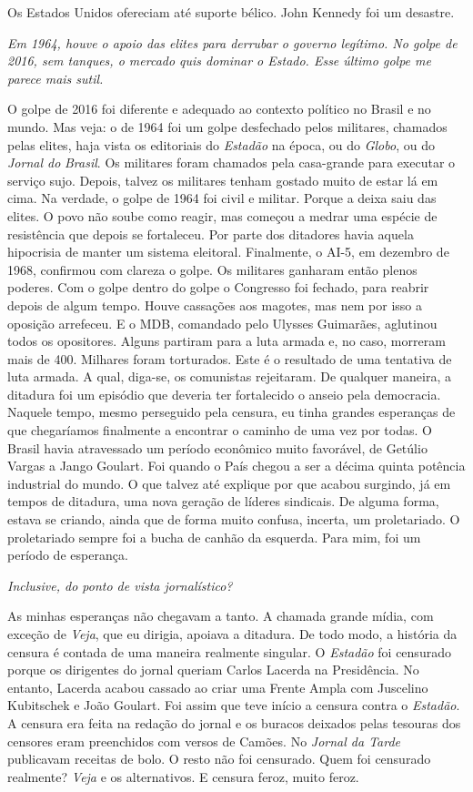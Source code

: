 \normalfont 
Os Estados Unidos ofereciam até suporte bélico. John
Kennedy foi um desastre.

\itshape
 Em 1964, houve o apoio das elites para derrubar o
governo legítimo. No golpe de 2016, sem tanques, o mercado quis dominar
o Estado. Esse último golpe me parece mais sutil.

\normalfont 
O golpe de 2016 foi diferente e adequado ao contexto
político no Brasil e no mundo. Mas veja: o de 1964 foi um golpe
desfechado pelos militares, chamados pelas elites, haja vista os
editoriais do \emph{Estadão} na época, ou do \emph{Globo}, ou do
\emph{Jornal do} \emph{Brasil}. Os militares foram chamados pela
casa-grande para executar o serviço sujo. Depois, talvez os militares
tenham gostado muito de estar lá em cima. Na verdade, o golpe de 1964
foi civil e militar. Porque a deixa saiu das elites. O povo não soube
como reagir, mas começou a medrar uma espécie de resistência que depois
se fortaleceu. Por parte dos ditadores havia aquela hipocrisia de manter
um sistema eleitoral. Finalmente, o AI-5, em dezembro de 1968, confirmou
com clareza o golpe. Os militares ganharam então plenos poderes. Com o
golpe dentro do golpe o Congresso foi fechado, para reabrir depois de
algum tempo. Houve cassações aos magotes, mas nem por isso a oposição
arrefeceu. E o MDB, comandado pelo Ulysses Guimarães, aglutinou todos os
opositores. Alguns partiram para a luta armada e, no caso, morreram mais
de 400. Milhares foram torturados. Este é o resultado de uma tentativa
de luta armada. A qual, diga-se, os comunistas rejeitaram. De qualquer
maneira, a ditadura foi um episódio que deveria ter fortalecido o anseio
pela democracia. Naquele tempo, mesmo perseguido pela censura, eu tinha
grandes esperanças de que chegaríamos finalmente a encontrar o caminho
de uma vez por todas. O Brasil havia atravessado um período econômico
muito favorável, de Getúlio Vargas a Jango Goulart. Foi quando o País
chegou a ser a décima quinta potência industrial do mundo. O que talvez
até explique por que acabou surgindo, já em tempos de ditadura, uma nova
geração de líderes sindicais. De alguma forma, estava se criando, ainda
que de forma muito confusa, incerta, um proletariado. O proletariado
sempre foi a bucha de canhão da esquerda. Para mim, foi um período de
esperança.

\itshape
 Inclusive, do ponto de vista jornalístico?

\normalfont 
As minhas esperanças não chegavam a tanto. A chamada
grande mídia, com exceção de \emph{Veja}, que eu dirigia, apoiava a
ditadura. De todo modo, a história da censura é contada de uma maneira
realmente singular. O \emph{Estadão} foi censurado porque os dirigentes
do jornal queriam Carlos Lacerda na Presidência. No entanto, Lacerda
acabou cassado ao criar uma Frente Ampla com Juscelino Kubitschek e João
Goulart. Foi assim que teve início a censura contra o \emph{Estadão}. A
censura era feita na redação do jornal e os buracos deixados pelas
tesouras dos censores eram preenchidos com versos de Camões. No
\emph{Jornal da Tarde} publicavam receitas de bolo. O resto não foi
censurado. Quem foi censurado realmente? \emph{Veja} e os alternativos.
E censura feroz, muito feroz.


